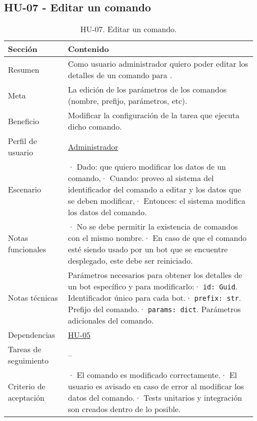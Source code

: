 \subsection{HU-07 - Editar un comando}
\label{sec:hu07}

\begin{table}[H]
    \centering
    \def\arraystretch{1.25}
    \begin{adjustbox}{max width=\textwidth}
    \begin{tabularx}{\textwidth}{|l|L|}
    \hline
        \textbf{Sección} & \textbf{Contenido} \\ \hline
    \hline
        Resumen & Como usuario administrador quiero poder editar los detalles de un comando para . \\ \hline
        Meta & La edición de los parámetros de los comandos (nombre, prefijo, parámetros, etc). \\ \hline
        Beneficio & Modificar la configuración de la tarea que ejecuta dicho comando. \\ \hline
        Perfil de usuario & \hyperref[sec:personaAdmin]{Administrador} \\ \hline
        Escenario & · Dado: que quiero modificar los datos de un comando,\linebreak · Cuando: proveo al sistema del identificador del comando a editar y los datos que se deben modificar,\linebreak · Entonces: el sistema modifica los datos del comando. \\ \hline
        Notas funcionales & · No se debe permitir la existencia de comandos con el mismo nombre.\linebreak · En caso de que el comando esté siendo usado por un bot que se encuentre desplegado, este debe ser reiniciado. \\ \hline
        Notas técnicas & Parámetros necesarios para obtener los detalles de un bot específico y para modificarlo:\linebreak · \verb|id: Guid|. Identificador único para cada bot.\linebreak · \verb|prefix: str|. Prefijo del comando.\linebreak · \verb|params: dict|. Parámetros adicionales del comando. \\ \hline
        Dependencias & \hyperref[sec:hu05]{HU-05} \\ \hline
        Tareas de seguimiento & – \\ \hline
        Criterio de aceptación & · El comando es modificado correctamente.\linebreak · El usuario es avisado en caso de error al modificar los datos del comando.\linebreak · Tests unitarios y integración son creados dentro de lo posible. \\ \hline
    \end{tabularx}
    \end{adjustbox}
    \caption{HU-07. Editar un comando.}
\end{table}

